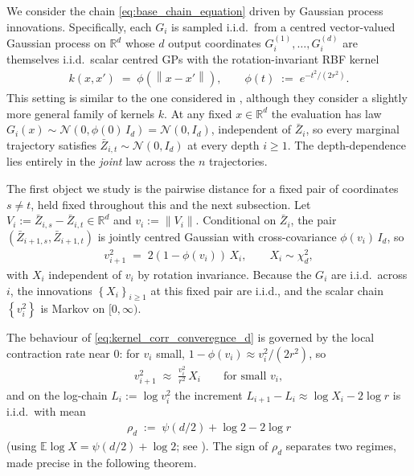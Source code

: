 \documentclass{article}
\newcommand{\RR}{\mathbb{R}}
\newcommand{\Set}[1]{\left\{ #1 \right\}}
\newcommand{\Brack}[1]{\left( #1 \right)}
\newcommand{\Exp}[1]{\mathbb{E} #1}
\newcommand{\norm}[1]{\left\|#1\right\|}
\newcommand{\mcN}{\mathcal{N}}
\newcommand{\bZ}{\bar{Z}}
\begin{document}
We consider the chain \eqref{eq:base_chain_equation} driven by Gaussian process innovations. Specifically, each $G_i$ is sampled i.i.d.\ from a centred vector-valued Gaussian process on $\RR^d$ whose $d$ output coordinates $G_i^{(1)}, \ldots, G_i^{(d)}$ are themselves i.i.d.\ scalar centred GPs with the rotation-invariant RBF kernel
\begin{eqnarray*}
  k(x, x') \;=\; \phi(\norm{x - x'}), \qquad \phi(t) \;:=\; e^{-t^2/(2r^2)}.
\end{eqnarray*}
This setting is similar to the one considered in \cite{dunlop2018how}, although they consider a slightly more general family of kernels $k$.
At any fixed $x \in \RR^d$ the evaluation has law $G_i(x) \sim \mcN(0, \phi(0)\, I_d) = \mcN(0, I_d)$, independent of $\bZ_i$, so every marginal trajectory satisfies $\bZ_{i,t} \sim \mcN(0, I_d)$ at every depth $i \ge 1$. The depth-dependence lies entirely in the \emph{joint} law across the $n$ trajectories.

The first object we study is the pairwise distance for a fixed pair of coordinates $s \ne t$, held fixed throughout this and the next subsection. Let $V_i := \bZ_{i,s} - \bZ_{i,t} \in \RR^d$ and $v_i := \norm{V_i}$. Conditional on $\bZ_i$, the pair $(\bZ_{i+1,s}, \bZ_{i+1,t})$ is jointly centred Gaussian with cross-covariance $\phi(v_i)\, I_d$, so
\begin{eqnarray}
  \label{eq:kernel_corr_converegnce_d}
  v_{i+1}^2 \;=\; 2\Brack{1 - \phi(v_i)}\, X_i, \qquad X_i \sim \chi^2_d,
\end{eqnarray}
with $X_i$ independent of $v_i$ by rotation invariance. Because the $G_i$ are i.i.d.\ across $i$, the innovations $\Set{X_i}_{i \ge 1}$ at this fixed pair are i.i.d., and the scalar chain $\Set{v_i^2}$ is Markov on $[0, \infty)$.

The behaviour of \eqref{eq:kernel_corr_converegnce_d} is governed by the local contraction rate near $0$: for $v_i$ small, $1 - \phi(v_i) \approx v_i^2 / (2r^2)$, so
\begin{eqnarray}
  \label{eq:near_origin_lin}
  v_{i+1}^2 \;\approx\; \frac{v_i^2}{r^2}\, X_i \qquad \text{for small } v_i,
\end{eqnarray}
and on the log-chain $L_i := \log v_i^2$ the increment $L_{i+1} - L_i \approx \log X_i - 2\log r$ is i.i.d.\ with mean
\begin{eqnarray}
  \label{eq:rho_d_def}
  \rho_d \;:=\; \psi(d/2) + \log 2 - 2\log r
\end{eqnarray}
(using $\Exp{\log X} = \psi(d/2) + \log 2$; see ). The sign of $\rho_d$ separates two regimes, made precise in the following theorem.
\end{document}
